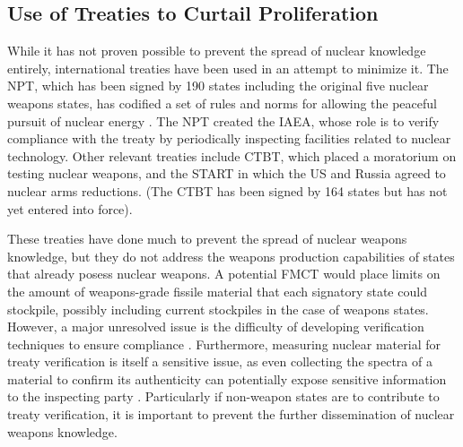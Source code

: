 \subsection{Use of Treaties to Curtail Proliferation}

While it has not proven possible to prevent the spread of nuclear knowledge entirely, international treaties have been used in an attempt to minimize it.  The \gls{NPT}, which has been signed by 190 states including the original five nuclear weapons states, has codified a set of rules and norms for allowing the peaceful pursuit of nuclear energy \cite{_treaty_????}.  The \gls{NPT} created the \gls{IAEA}, whose role is to verify compliance with the treaty by periodically inspecting facilities related to nuclear technology.  Other relevant treaties include \gls{CTBT}, which placed a moratorium on testing nuclear weapons, and the \gls{START} in which the \gls{US} and Russia agreed to nuclear arms reductions. (The \gls{CTBT} has been signed by 164 states but has not yet entered into force).

These treaties have done much to prevent the spread of nuclear weapons knowledge, but they do not address the weapons production capabilities of states that already posess nuclear weapons.
A potential \gls{FMCT} would place limits on the amount of weapons-grade fissile material that each signatory state could stockpile, possibly including current stockpiles in the case of weapons states.  However, a major unresolved issue is the difficulty of developing verification techniques to ensure compliance \cite{_fissile_2013}.  Furthermore, measuring nuclear material for treaty verification is itself a sensitive issue, as even collecting the spectra of a material to confirm its authenticity can potentially expose sensitive information to the inspecting party \cite{glaser_zero-knowledge_2014}. Particularly if non-weapon states are to contribute to treaty verification, it is important to prevent the further dissemination of nuclear weapons knowledge.

